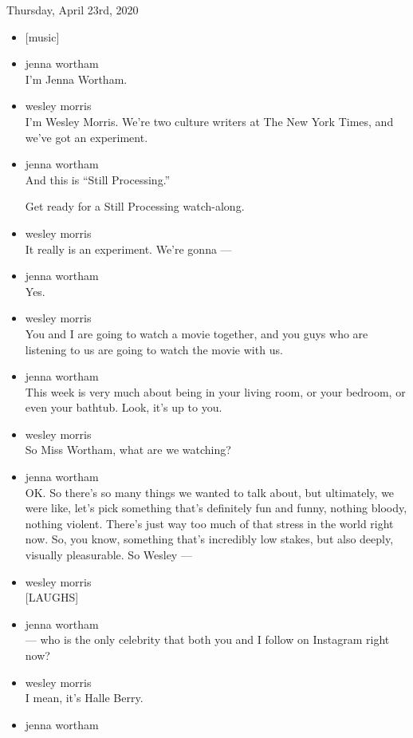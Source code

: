 Thursday, April 23rd, 2020

\begin{itemize}
\item
  {[}music{]}
\item
  jenna wortham\\
  I'm Jenna Wortham.
\item
  wesley morris\\
  I'm Wesley Morris. We're two culture writers at The New York Times,
  and we've got an experiment.
\item
  jenna wortham\\
  And this is ``Still Processing.''

  Get ready for a Still Processing watch-along.
\item
  wesley morris\\
  It really is an experiment. We're gonna ---
\item
  jenna wortham\\
  Yes.
\item
  wesley morris\\
  You and I are going to watch a movie together, and you guys who are
  listening to us are going to watch the movie with us.
\item
  jenna wortham\\
  This week is very much about being in your living room, or your
  bedroom, or even your bathtub. Look, it's up to you.
\item
  wesley morris\\
  So Miss Wortham, what are we watching?
\item
  jenna wortham\\
  OK. So there's so many things we wanted to talk about, but ultimately,
  we were like, let's pick something that's definitely fun and funny,
  nothing bloody, nothing violent. There's just way too much of that
  stress in the world right now. So, you know, something that's
  incredibly low stakes, but also deeply, visually pleasurable. So
  Wesley ---
\item
  wesley morris\\
  {[}LAUGHS{]}
\item
  jenna wortham\\
  --- who is the only celebrity that both you and I follow on Instagram
  right now?
\item
  wesley morris\\
  I mean, it's Halle Berry.
\item
  jenna wortham\\

\end{itemize}
